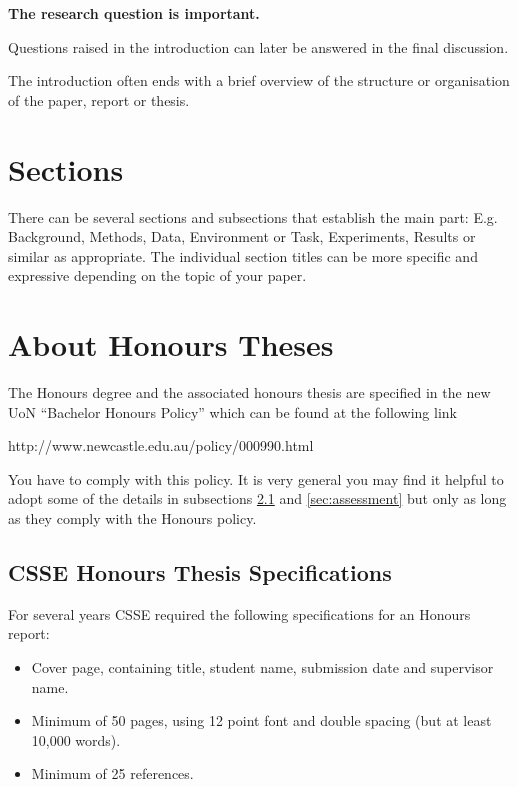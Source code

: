 \documentclass[a4,12pt]{article}
\newenvironment{boxit}{\begin{lrbox}{\savepar}
        \begin{minipage}[b]{4.6in}}
        {\end{minipage}\end{lrbox}\fbox{\usebox{\savepar}}}
\begin{document}
\begin{center}
\begin{boxit}
\textbf{The research question is important.}
\end{boxit}
\end{center}

Questions raised in the introduction can later be answered in the final discussion.

The introduction often ends with a brief overview of the structure or organisation of
the paper, report or thesis.

%
\section{Sections}
%
There can be several sections and subsections that establish the main part: E.g. Background, Methods, Data, Environment or Task, Experiments, Results or similar as appropriate. The individual section titles can be more specific and expressive depending on the topic of your paper. 

%
\section{About Honours Theses}
%
The Honours degree and the associated honours thesis are specified in the new UoN ``Bachelor Honours Policy'' which can be found at the following link
\begin{center}
{http://www.newcastle.edu.au/policy/000990.html}
\end{center}
You have to comply with this policy. It is very general you may find it helpful to adopt some of the details in subsections \ref{sec:thesis} and \ref{sec:assessment} but only as long as they comply with the Honours policy.

\subsection{CSSE Honours Thesis Specifications}\label{sec:thesis}
For several years CSSE required the following specifications for an Honours report:
\begin{itemize}
\item Cover page, containing title, student name, submission date and supervisor name.
\item Minimum of 50 pages, using 12 point font and double spacing (but at least 10,000 words).
\item Minimum of 25 references.
\end{itemize}
\end{document}
